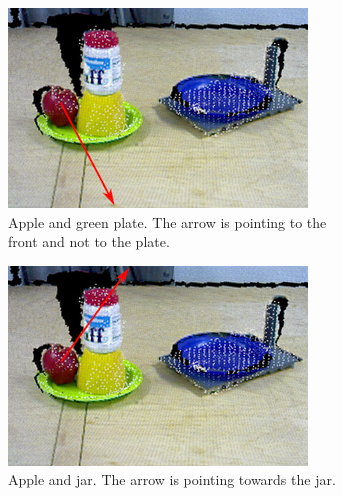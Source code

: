 \begin{figure}
  \centering
  \begin{subfigure}[t]{0.475\textwidth}
    \includegraphics[width=\textwidth]{./figures/sec/geometrical_reasoning/affordance_arrow_scene7_1.jpg}
    \caption{Apple and green plate. The arrow is pointing to the front and not to the plate.}
    \label{fig:sec_enriched_geometricalreasoning_experiments_scene2_1}
  \end{subfigure}
  \hfill
  \begin{subfigure}[t]{0.475\textwidth}
    \includegraphics[width=\textwidth]{./figures/sec/geometrical_reasoning/affordance_arrow_scene7_2.jpg}
    \caption{Apple and jar. The arrow is pointing towards the jar.}
    \label{fig:sec_enriched_geometricalreasoning_experiments_scene2_2}
  \end{subfigure}\\%
  \begin{subfigure}[t]{0.475\textwidth}

\end{subfigure}
\end{figure}

